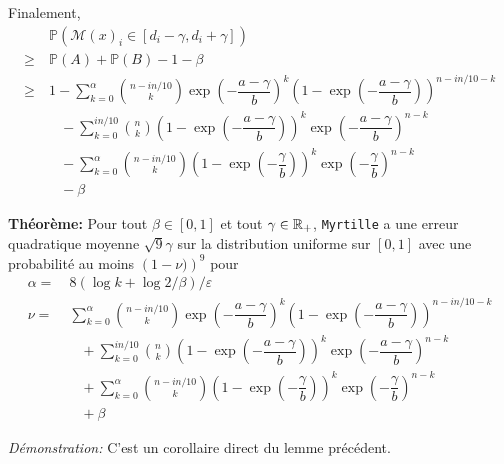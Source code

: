 Finalement,
\begin{align*}
    &\  \mathbb P\left(  \mathcal M(x)_i \in [d_i - \gamma, d_i + \gamma] \right)  \\
    \geq &\   \mathbb P(A) + \mathbb P (B) - 1 - \beta \\
    \geq &\  1 - \sum_{k = 0}^{\alpha} \binom{n - in/10}{k}\exp\left( -\dfrac{a-\gamma}{b} \right)^k \left( 1 - \exp\left( -\dfrac{a-\gamma}{b} \right) \right)^{n - in/10 -k} \\
    & \quad  - \sum_{k = 0}^{in/10} \binom{n}{k} \left( 1 - \exp\left( -\dfrac{a-\gamma}{b} \right) \right)^k \exp\left( -\dfrac{a-\gamma}{b} \right)^{n-k} \\
    & \quad - \sum_{k = 0}^{\alpha} \binom{n - in/10}{k} \left( 1 - \exp\left( -\dfrac{\gamma}{b} \right) \right)^k \exp\left( -\dfrac{\gamma}{b} \right)^{n-k}\\
    & \quad - \beta
\end{align*}

\vspace*{5pt}
\textbf{Théorème: } Pour tout \(\beta \in [0,1]\) et tout \(\gamma \in \mathbb{R}_+\), \texttt{Myrtille} a une erreur quadratique moyenne \(\sqrt{9}\gamma\) sur la distribution uniforme sur \([0,1]\) avec une probabilité au moins \(\left( 1 - \nu) \right)^9\) pour 
\begin{align*}
    \alpha =&\ 8\left( \log k + \log 2/\beta \right)/\varepsilon\\
    \nu = &\ \sum_{k = 0}^{\alpha} \binom{n - in/10}{k}\exp\left( -\dfrac{a-\gamma}{b} \right)^k \left( 1 - \exp\left( -\dfrac{a-\gamma}{b} \right) \right)^{n - in/10 -k} \\
    & \quad  + \sum_{k = 0}^{in/10} \binom{n}{k} \left( 1 - \exp\left( -\dfrac{a-\gamma}{b} \right) \right)^k \exp\left( -\dfrac{a-\gamma}{b} \right)^{n-k} \\
    & \quad + \sum_{k = 0}^{\alpha} \binom{n - in/10}{k} \left( 1 - \exp\left( -\dfrac{\gamma}{b} \right) \right)^k \exp\left( -\dfrac{\gamma}{b} \right)^{n-k}\\
    & \quad + \beta
\end{align*}

\textit{Démonstration:} C'est un corollaire direct du lemme précédent. 


